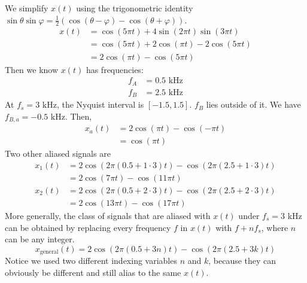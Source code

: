 \begin{itemize}
We simplify $x(t)$ using the trigonometric identity
$\sin\theta\sin\varphi = \frac{1}{2}(\cos(\theta-\varphi)-\cos(\theta+\varphi))$.
\begin{align*}
	x(t) &= \cos(5\pi t) + 4\sin(2\pi t)\sin(3\pi t) \\
		 &= \cos(5\pi t) + 2\cos(\pi t) - 2\cos(5\pi t) \\
		 &= 2\cos(\pi t) - \cos(5\pi t)
\end{align*}
Then we know $x(t)$ has frequencies:
\begin{align*}
	f_A &= 0.5 \text{ kHz} \\
	f_B &= 2.5 \text{ kHz}
\end{align*}
At $f_s = 3$ kHz, the Nyquist interval is $[-1.5,1.5]$. $f_B$ lies outside of it.
We have $f_{B,a} = -0.5$ kHz. Then,
\begin{align*}
	x_a(t) &= 2\cos(\pi t) - \cos(-\pi t) \\
		   &= \cos(\pi t)
\end{align*}
Two other aliased signals are
\begin{align*}
	x_1(t) &= 2\cos(2\pi(0.5+1\cdot 3)t) - \cos(2\pi(2.5+1\cdot 3)t) \\
		   &= 2\cos(7\pi t) - \cos(11\pi t) \\
	x_2(t) &= 2\cos(2\pi(0.5+2\cdot 3)t) - \cos(2\pi(2.5+2\cdot 3)t) \\
		   &= 2\cos(13\pi t) - \cos(17\pi t)
\end{align*}
More generally, the class of signals that are aliased with $x(t)$ under
$f_s = 3$ kHz can be obtained by replacing every frequency $f$ in $x(t)$
with $f + nf_s$, where $n$ can be any integer.
\begin{equation*}
	x_{\text{general}}(t)
	= 2\cos(2\pi(0.5+3n)t) - \cos(2\pi(2.5+3k)t)
\end{equation*}
Notice we used two different indexing variables $n$ and $k$, because
they can obviously be different and still alias to the same $x(t)$.

\end{itemize}

